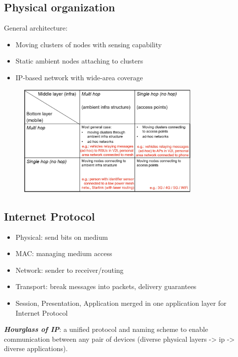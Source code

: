 \documentclass[11pt]{article}
\let\oldemph\emph
\renewcommand{\emph}[1]{\oldemph{\textbf{#1}}\marginpar{\textbf{#1}}}
\begin{document}
    \subsection{Physical organization}

    General architecture:
    \begin{itemize}
        \item Moving clusters of nodes with sensing capability
        \item Static ambient nodes attaching to clusters
        \item IP-based network with wide-area coverage
    \end{itemize}

    \begin{figure}[H]
        \centering
        \includegraphics[width=0.8\textwidth]{img/paste-20201208121214.png}
    \end{figure}

    \subsection{Internet Protocol}

    \begin{itemize}
        \item Physical:  send bits on medium
        \item MAC: managing medium access
        \item Network: sender to receiver/routing
        \item Transport: break messages into packets, delivery guarantees
        \item Session, Presentation, Application merged in one application layer for Internet Protocol
    \end{itemize}

    \emph{Hourglass of IP}: a unified protocol and naming scheme to enable communication between any pair of devices (diverse physical layers -> ip -> diverse applications).
\end{document}
